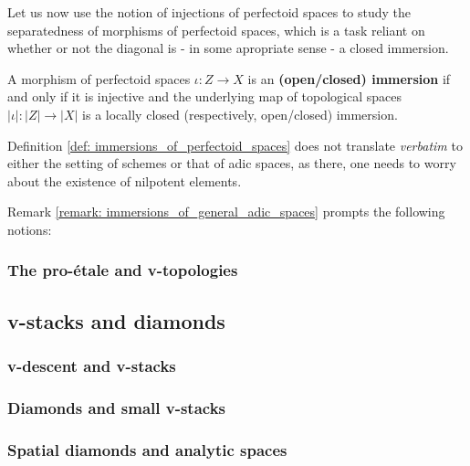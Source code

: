             Let us now use the notion of injections of perfectoid spaces to study the separatedness of morphisms of perfectoid spaces, which is a task reliant on whether or not the diagonal is - in some apropriate sense - a closed immersion.
            \begin{definition} \label{def: immersions_of_perfectoid_spaces}
                A morphism of perfectoid spaces $\iota: Z \to X$ is an \textbf{(open/closed) immersion} if and only if it is injective and the underlying map of topological spaces $|\iota|: |Z| \to |X|$ is a locally closed (respectively, open/closed) immersion.
            \end{definition}
            \begin{remark} \label{remark: immersions_of_general_adic_spaces} 
                Definition \ref{def: immersions_of_perfectoid_spaces} does not translate \textit{verbatim} to either the setting of schemes or that of adic spaces, as there, one needs to worry about the existence of nilpotent elements. 
            \end{remark}
            Remark \ref{remark: immersions_of_general_adic_spaces} prompts the following notions:
            \begin{definition}
                
            \end{definition}
        
        \subsubsection{The pro-\'etale and v-topologies}
    
    \subsection{v-stacks and diamonds}
        \subsubsection{v-descent and v-stacks}
        
        \subsubsection{Diamonds and small v-stacks}
        
        \subsubsection{Spatial diamonds and analytic spaces}